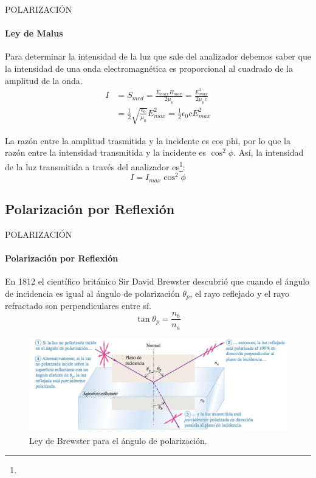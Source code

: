 \begin{frame}{POLARIZACIÓN}
    \framesubtitle{Ley de Malus}
    Para determinar la intensidad de la luz que sale del analizador debemos saber que la intensidad de una onda electromagnética es proporcional al cuadrado de la amplitud de la onda.
    \begin{equation}
        \begin{split}
            I&=S_{med}=\frac{E_{max}B_{max}}{2\mu_0}=\frac{E_{max}^2}{2\mu_0 c}
            \\&=\frac{1}{2}\sqrt{\frac{\epsilon_0}{\mu_0}}E_{max}^{2}=\frac{1}{2}\epsilon_0 cE_{max}^2
        \end{split}
    \end{equation}

    La razón entre la amplitud trasmitida y la incidente es cos phi, por lo que la razón entre la intensidad transmitida y la incidente es $\cos^2{\phi}$. Así, la intensidad de la luz transmitida a través del analizador es\footnote{}:
    \begin{equation}
        I = I_{max}\cos^2{\phi}
    \end{equation}
\end{frame}
\subsection{Polarización por Reflexión}



\begin{frame}{POLARIZACIÓN}
    \framesubtitle{Polarización por Reflexión}
    En 1812 el científico británico Sir David Brewster descubrió que cuando el ángulo de incidencia es igual al ángulo de polarización $\theta_p$, el rayo reflejado y el rayo refractado son perpendiculares entre sí.
    \begin{equation}
        \tan{\theta_p}=\frac{n_b}{n_a}
    \end{equation}
    \begin{figure}
        \includegraphics[scale=0.2775]{mari/m_reflex.jpeg}
        \caption{Ley de Brewster para el ángulo de polarización\footnotemark{}.}
    \end{figure}
    \vspace{-1cm}
\end{frame}
